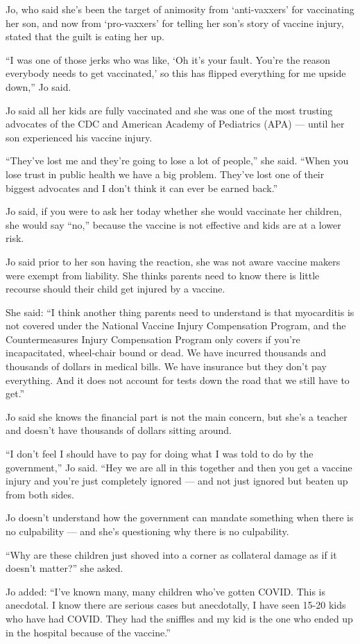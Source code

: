 {Jo, who said she’s been the target of animosity from ‘anti-vaxxers’ for
vaccinating her son, and now from ‘pro-vaxxers’ for telling her son’s story of
vaccine injury, stated that the guilt is eating her up.

“I was one of those jerks who was like, ‘Oh it’s your fault. You’re the reason
everybody needs to get vaccinated,’ so this has flipped everything for me upside
down,” Jo said.

Jo said all her kids are fully vaccinated and she was one of the most trusting
advocates of the CDC and American Academy of Pediatrics (APA) — until her son
experienced his vaccine injury.

“They’ve lost me and they’re going to lose a lot of people,” she said. “When you
lose trust in public health we have a big problem. They’ve lost one of their
biggest advocates and I don’t think it can ever be earned back.”

Jo said, if you were to ask her today whether she would vaccinate her children,
she would say “no,” because the vaccine is not effective and kids are at a lower
risk.

Jo said prior to her son having the reaction, she was not aware vaccine makers
were exempt from liability. She thinks parents need to know there is little
recourse should their child get injured by a vaccine.

She said: “I think another thing parents need to understand is that myocarditis
is not covered under the National Vaccine Injury Compensation Program, and the
Countermeasures Injury Compensation Program only covers if you’re incapacitated,
wheel-chair bound or dead. We have incurred thousands and thousands of dollars
in medical bills. We have insurance but they don’t pay everything. And it does
not account for tests down the road that we still have to get.”

Jo said she knows the financial part is not the main concern, but she’s a
teacher and doesn’t have thousands of dollars sitting around.

“I don’t feel I should have to pay for doing what I was told to do by the
government,” Jo said. “Hey we are all in this together and then you get a
vaccine injury and you’re just completely ignored — and not just ignored but
beaten up from both sides.

Jo doesn’t understand how the government can mandate something when there is no
culpability — and she’s questioning why there is no culpability.

“Why are these children just shoved into a corner as collateral damage as if it
doesn’t matter?” she asked.

Jo added: “I’ve known many, many children who’ve gotten COVID. This is
anecdotal. I know there are serious cases but anecdotally, I have seen 15-20
kids who have had COVID. They had the sniffles and my kid is the one who ended
up in the hospital because of the vaccine.”

}
